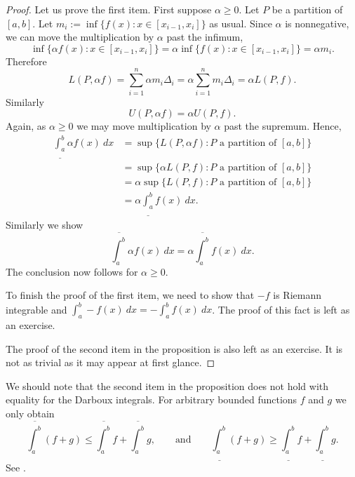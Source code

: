 \documentclass[12pt]{book}
\begin{document}
\begin{proof}
Let us prove the first item.
First suppose $\alpha \geq 0$.
Let $P$ be a partition of $[a,b]$.
Let $m_i := \inf \{ f(x) : x \in [x_{i-1},x_i] \}$ as usual.
Since $\alpha$ is nonnegative, we can move the multiplication by $\alpha$
past the infimum,
\begin{equation*}
\inf \{ \alpha f(x) : x \in [x_{i-1},x_i] \}
=
\alpha \inf \{ f(x) : x \in [x_{i-1},x_i] \} = \alpha m_i .
\end{equation*}
Therefore
\begin{equation*}
L(P,\alpha f) =
\sum_{i=1}^n \alpha m_i \Delta_i = \alpha \sum_{i=1}^n m_i \Delta_i = \alpha
L(P,f).
\end{equation*}
Similarly 
\begin{equation*}
U(P,\alpha f) = \alpha U(P,f) .
\end{equation*}
Again, as $\alpha \geq 0$ we
may move multiplication by $\alpha$ past the supremum.
Hence,
\begin{equation*}
\begin{split}
\underline{\int_a^b} \alpha f(x)~dx & =
\sup \{ L(P,\alpha f) : \text{$P$ a partition of $[a,b]$} \}
\\
& =
\sup \{ \alpha L(P,f) : \text{$P$ a partition of $[a,b]$} \}
\\
& =
\alpha
\sup \{ L(P,f) : \text{$P$ a partition of $[a,b]$} \}
\\
& =
\alpha
\underline{\int_a^b} f(x)~dx .
\end{split}
\end{equation*}
Similarly we show 
\begin{equation*}
\overline{\int_a^b} \alpha f(x)~dx
=
\alpha
\overline{\int_a^b} f(x)~dx .
\end{equation*}
The conclusion now follows for $\alpha \geq 0$.

To finish the proof of the first item, we need to show 
that $-f$ is Riemann integrable and
$\int_a^b - f(x)~dx =
-
\int_a^b f(x)~dx$.
The proof of this fact is left as an exercise.

The proof of the second item in the proposition is also left as an exercise.
It is not as
trivial as it may appear at first glance.
\end{proof}

We should note that the second item in the proposition does not hold with
equality for the Darboux integrals.
For arbitrary bounded functions $f$ and $g$ we
only obtain
\begin{equation*}
\overline{\int_a^b} (f+g) \leq \overline{\int_a^b}f+\overline{\int_a^b}g
,
\qquad
\text{and}
\qquad
\underline{\int_a^b} (f+g) \geq \underline{\int_a^b}f+\underline{\int_a^b}g
.
\end{equation*}
See .
\end{document}
